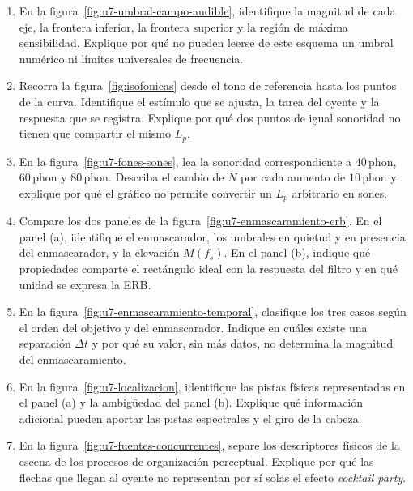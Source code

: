 \begin{enumerate}[label=\textbf{I\arabic*.},leftmargin=*]
    \item En la figura~\ref{fig:u7-umbral-campo-audible}, identifique la
    magnitud de cada eje, la frontera inferior, la frontera superior y la
    región de máxima sensibilidad. Explique por qué no pueden leerse de este
    esquema un umbral numérico ni límites universales de frecuencia.

    \item Recorra la figura~\ref{fig:isofonicas} desde el tono de referencia
    hasta los puntos de la curva. Identifique el estímulo que se ajusta, la
    tarea del oyente y la respuesta que se registra. Explique por qué dos
    puntos de igual sonoridad no tienen que compartir el mismo \(L_p\).

    \item En la figura~\ref{fig:u7-fones-sones}, lea la sonoridad
    correspondiente a \(40\,\text{phon}\), \(60\,\text{phon}\) y
    \(80\,\text{phon}\). Describa el cambio de \(N\) por cada aumento de
    \(10\,\text{phon}\) y explique por qué el gráfico no permite convertir un
    \(L_p\) arbitrario en sones.

    \item Compare los dos paneles de la
    figura~\ref{fig:u7-enmascaramiento-erb}. En el panel (a), identifique el
    enmascarador, los umbrales en quietud y en presencia del enmascarador, y la
    elevación \(M(f_s)\). En el panel (b), indique qué propiedades comparte el
    rectángulo ideal con la respuesta del filtro y en qué unidad se expresa la
    ERB.

    \item En la figura~\ref{fig:u7-enmascaramiento-temporal}, clasifique los
    tres casos según el orden del objetivo y del enmascarador. Indique en
    cuáles existe una separación \(\Delta t\) y por qué su valor, sin más
    datos, no determina la magnitud del enmascaramiento.

    \item En la figura~\ref{fig:u7-localizacion}, identifique las pistas
    físicas representadas en el panel (a) y la ambigüedad del panel (b).
    Explique qué información adicional pueden aportar las pistas espectrales
    y el giro de la cabeza.

    \item En la figura~\ref{fig:u7-fuentes-concurrentes}, separe los
    descriptores físicos de la escena de los procesos de organización
    perceptual. Explique por qué las flechas que llegan al oyente no
    representan por sí solas el efecto \emph{cocktail party}.
\end{enumerate}

